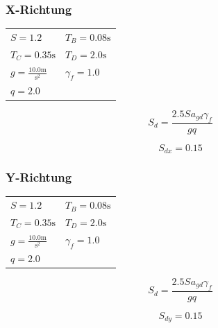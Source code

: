 \documentclass[
  letterpaper,
  DIV=11]{scrreprt}
\begin{document}
\hypertarget{x-richtung-5}{%
\subsubsection{X-Richtung}\label{x-richtung-5}}

\begin{longtable}[]{@{}
  >{\raggedright\arraybackslash}p{}
  >{\raggedright\arraybackslash}p{}@{}}
\toprule\noalign{}
\endhead
\bottomrule\noalign{}
\endlastfoot
\(S = 1.2\) & \(T_{B} = 0.08 \text{s}\) \\
\(T_{C} = 0.35 \text{s}\) & \(T_{D} = 2.0 \text{s}\) \\
\(g = \frac{10.0 \text{m}}{\text{s}^{2}}\) & \(\gamma_{f} = 1.0\) \\
\(q = 2.0\) & \\
\end{longtable}

\begin{equation}S_{d} = \frac{2.5 S_{} a_{gd} \gamma_{f}}{g q}\end{equation}

\begin{equation}S_{d x} = 0.15\end{equation}

\hypertarget{y-richtung-5}{%
\subsubsection{Y-Richtung}\label{y-richtung-5}}

\begin{longtable}[]{@{}
  >{\raggedright\arraybackslash}p{}
  >{\raggedright\arraybackslash}p{}@{}}
\toprule\noalign{}
\endhead
\bottomrule\noalign{}
\endlastfoot
\(S = 1.2\) & \(T_{B} = 0.08 \text{s}\) \\
\(T_{C} = 0.35 \text{s}\) & \(T_{D} = 2.0 \text{s}\) \\
\(g = \frac{10.0 \text{m}}{\text{s}^{2}}\) & \(\gamma_{f} = 1.0\) \\
\(q = 2.0\) & \\
\end{longtable}

\begin{equation}S_{d} = \frac{2.5 S_{} a_{gd} \gamma_{f}}{g q}\end{equation}

\begin{equation}S_{d y} = 0.15\end{equation}
\end{document}
